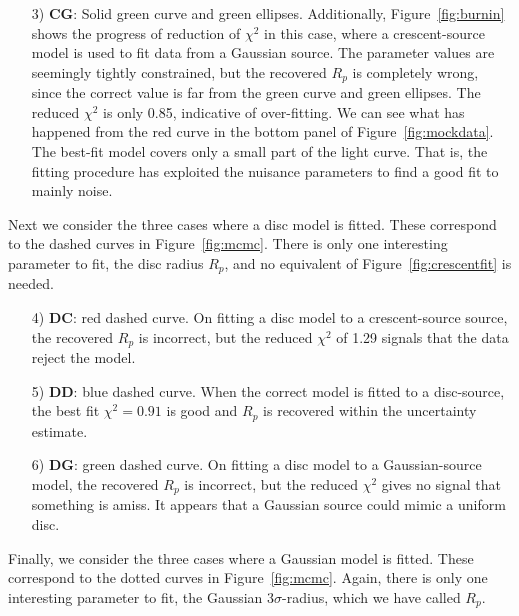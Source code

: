 \documentclass[usenatbib]{mn2e}
\begin{document}
\begin{enumerate}
\item[3) {\bf CG}:] Solid green curve and green ellipses.
  Additionally, Figure~\ref{fig:burnin} shows the progress of
  reduction of $\chi^2$ in this case, where a crescent-source model is
  used to fit data from a Gaussian source.  The parameter values are
  seemingly tightly constrained, but the recovered $R_p$ is completely
  wrong, since the correct value is far from the green curve and green
  ellipses.  The reduced $\chi^2$ is only 0.85, indicative of
  over-fitting.  We can see what has happened from the red curve in
  the bottom panel of Figure~\ref{fig:mockdata}.  The best-fit model
  covers only a small part of the light curve.  That is, the fitting
  procedure has exploited the nuisance parameters to find a good fit
  to mainly noise.

\end{enumerate}

Next we consider the three cases where a disc model is fitted.  These
correspond to the dashed curves in Figure~\ref{fig:mcmc}.  There is
only one interesting parameter to fit, the disc radius $R_p$, and no
equivalent of Figure~\ref{fig:crescentfit} is needed. 

\begin{enumerate}

\item[4) {\bf DC}:] red dashed curve.  On fitting a disc model to a
  crescent-source source, the recovered $R_p$ is incorrect, but the
  reduced $\chi^2$ of 1.29 signals that the data reject the model.

\item[5) {\bf DD}:] blue dashed curve.  When the correct model is
  fitted to a disc-source, the best fit $\chi^2=0.91$ is good and
  $R_p$ is recovered within the uncertainty estimate.

\item[6) {\bf DG}:] green dashed curve.  On fitting a disc model to a
  Gaussian-source model, the recovered $R_p$ is incorrect, but the
  reduced $\chi^2$ gives no signal that something is amiss.  It
  appears that a Gaussian source could mimic a uniform disc.

\end{enumerate}

Finally, we consider the three cases where a Gaussian model is fitted.
These correspond to the dotted curves in Figure~\ref{fig:mcmc}.  Again,
there is only one interesting parameter to fit, the Gaussian
$3\sigma$-radius, which we have called $R_p$.
\end{document}
